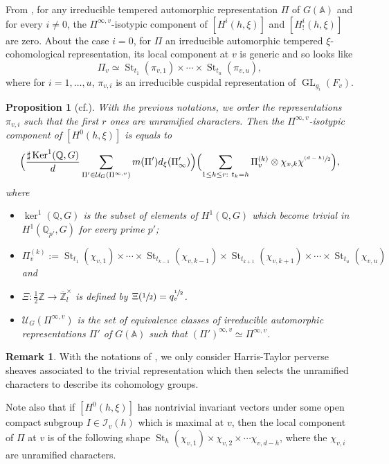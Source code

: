 \documentclass[11pt]{article}
\newcommand{\cf}{cf.\xspace}
\newcommand{\psfrac}[2]{\sfrac{(#1)}{#2}}
\DeclareMathOperator{\GL}{GL}
\theoremstyle{plain}
\newtheorem{prop}[equation]{Proposition}
\theoremstyle{definition}
\newtheorem*{remark}{Remark}
\numberwithin{equation}{subsection}
\newcommand\Am{{\mathbb A}}
\newcommand\Qm{{\mathbb Q}}
\newcommand\Zm{{\mathbb Z}}
\newcommand\IC{{\mathcal I}}
\newcommand\UC{{\mathcal U}}
\DeclareMathOperator{\st}{St}
\let \oo=\infty
\begin{document}
From \cite[Prop.\,3.6]{boyer-imj}, for any irreducible tempered automorphic representation
$\Pi$ of $G(\Am)$ and for every $i \neq 0$, the $\Pi^{\oo,v}$-isotypic component of
$[H^i(h,\xi)]$ and $[H^i_!(h,\xi)]$ are zero. About the case $i=0$, for $\Pi$ an irreducible
automorphic tempered $\xi$\nobreakdash-coho\-mo\-logical representation, its local component at $v$ is generic and so looks like
\[
\Pi_v \simeq \st_{t_1}(\pi_{v,1}) \times \cdots \times \st_{t_u}(\pi_{v,u}),
\]
where for $i=1,\dots,u$, $\pi_{v,i}$ is an irreducible cuspidal representation of $\GL_{g_i}(F_v)$.

\begin{prop}[{\cf \cite[Prop.\,3.9]{boyer-imj}}]\label{prop-temperee-explicite}
With the previous notations, we order the representations~$\pi_{v,i}$ such that the first $r$ ones are unramified
characters. Then the $\Pi^{\oo,v}$-isotypic component of $[H^0(h,\xi)]$ is equals to
\[
\Bigl (\frac{\sharp \ker^1(\Qm,G)}{d} \sum_{\Pi' \in \UC_G(\Pi^{\oo,v})}
m(\Pi') d_\xi(\Pi'_\oo) \Bigr) \Bigl (\sum_{1 \leq k \leq r:~ t_k=h} \Pi_v^{(k)} \otimes \chi_{v,k}
\chi^{\psfrac{d-h}{2}} \Bigr),
\]
where
\begin{itemize}
\item $ \ker^1(\Qm,G)$ is the subset of elements of $H^1(\Qm,G)$ which become trivial
in $H^1(\Qm_{p'},G)$ for every prime $p'$;

\item $\Pi_v^{(k)}:= \st_{t_1}(\chi_{v,1}) \times \cdots \times \st_{t_{k-1}}(\chi_{v,k-1}) \times
\st_{t_{k+1}}(\chi_{v,k+1}) \times \cdots \times \st_{t_u}(\chi_{v,u})$ and

\item $\Xi:\frac{1}{2} \Zm \to \overline \Zm_l^\times$
is defined by $\Xi(\sfrac{1}{2})=q_v^{\sfrac{1}{2}}$.

\item $\UC_G(\Pi^{\oo,v})$ is the set of equivalence classes of irreducible automorphic
representations $\Pi'$ of $G(\Am)$ such that $(\Pi')^{\oo,v} \simeq \Pi^{\oo,v}$.
\end{itemize}
\end{prop}

\begin{remark}
With the notations of \cite{boyer-imj}, we only consider Harris-Taylor perverse
sheaves associated to the trivial representation which then selects the unramified
characters to describe its cohomology groups.

Note also that if $[H^0(h,\xi)]$ has nontrivial invariant vectors under some open
compact subgroup $I \in \IC_v(h)$ which is maximal at $v$, then the local component
of $\Pi$ at $v$ is of the following shape $\st_h(\chi_{v,1}) \times \chi_{v,2} \times \cdots \chi_{v,d-h}$,
where the $\chi_{v,i}$ are unramified characters.
\end{remark}
\end{document}
